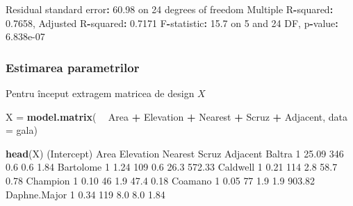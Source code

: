 \documentclass[]{article}
\newenvironment{Shaded}{\begin{snugshade}}{\end{snugshade}}
\newcommand{\KeywordTok}[1]{\textcolor[rgb]{0.13,0.29,0.53}{\textbf{#1}}}
\newcommand{\DataTypeTok}[1]{\textcolor[rgb]{0.13,0.29,0.53}{#1}}
\newcommand{\DecValTok}[1]{\textcolor[rgb]{0.00,0.00,0.81}{#1}}
\newcommand{\FloatTok}[1]{\textcolor[rgb]{0.00,0.00,0.81}{#1}}
\newcommand{\StringTok}[1]{\textcolor[rgb]{0.31,0.60,0.02}{#1}}
\newcommand{\OperatorTok}[1]{\textcolor[rgb]{0.81,0.36,0.00}{\textbf{#1}}}
\newcommand{\NormalTok}[1]{#1}
\begin{document}
\begin{Shaded}
\begin{Highlighting}[]
\NormalTok{Residual standard error}\OperatorTok{:}\StringTok{ }\FloatTok{60.98}\NormalTok{ on }\DecValTok{24}\NormalTok{ degrees of freedom}
\NormalTok{Multiple R}\OperatorTok{-}\NormalTok{squared}\OperatorTok{:}\StringTok{  }\FloatTok{0.7658}\NormalTok{,    Adjusted R}\OperatorTok{-}\NormalTok{squared}\OperatorTok{:}\StringTok{  }\FloatTok{0.7171} 
\NormalTok{F}\OperatorTok{-}\NormalTok{statistic}\OperatorTok{:}\StringTok{  }\FloatTok{15.7}\NormalTok{ on }\DecValTok{5}\NormalTok{ and }\DecValTok{24}\NormalTok{ DF,  p}\OperatorTok{-}\NormalTok{value}\OperatorTok{:}\StringTok{ }\FloatTok{6.838e-07}
\end{Highlighting}
\end{Shaded}

\subsubsection{Estimarea parametrilor}\label{estimarea-parametrilor-1}

Pentru început extragem matricea de design \(X\)

\begin{Shaded}
\begin{Highlighting}[]
\NormalTok{X =}\StringTok{ }\KeywordTok{model.matrix}\NormalTok{( }\OperatorTok{~}\StringTok{ }\NormalTok{Area }\OperatorTok{+}\StringTok{ }\NormalTok{Elevation }\OperatorTok{+}\StringTok{ }\NormalTok{Nearest }\OperatorTok{+}\StringTok{ }\NormalTok{Scruz }\OperatorTok{+}\StringTok{ }\NormalTok{Adjacent, }
    \DataTypeTok{data =}\NormalTok{ gala)}

\KeywordTok{head}\NormalTok{(X)}
\NormalTok{             (Intercept)  Area Elevation Nearest Scruz Adjacent}
\NormalTok{Baltra                 }\DecValTok{1} \FloatTok{25.09}       \DecValTok{346}     \FloatTok{0.6}   \FloatTok{0.6}     \FloatTok{1.84}
\NormalTok{Bartolome              }\DecValTok{1}  \FloatTok{1.24}       \DecValTok{109}     \FloatTok{0.6}  \FloatTok{26.3}   \FloatTok{572.33}
\NormalTok{Caldwell               }\DecValTok{1}  \FloatTok{0.21}       \DecValTok{114}     \FloatTok{2.8}  \FloatTok{58.7}     \FloatTok{0.78}
\NormalTok{Champion               }\DecValTok{1}  \FloatTok{0.10}        \DecValTok{46}     \FloatTok{1.9}  \FloatTok{47.4}     \FloatTok{0.18}
\NormalTok{Coamano                }\DecValTok{1}  \FloatTok{0.05}        \DecValTok{77}     \FloatTok{1.9}   \FloatTok{1.9}   \FloatTok{903.82}
\NormalTok{Daphne.Major           }\DecValTok{1}  \FloatTok{0.34}       \DecValTok{119}     \FloatTok{8.0}   \FloatTok{8.0}     \FloatTok{1.84}
\end{Highlighting}
\end{Shaded}
\end{document}
